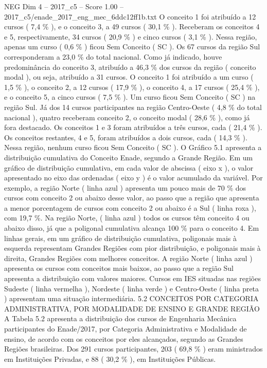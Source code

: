 \begin{textsample}{NEG Dim 4 – 2017\_c5 – Score 1.00 – 2017\_c5/enade\_2017\_eng\_mec\_6ddc12ff1b.txt}
O conceito 1 foi atribuído a 12 cursos ( 7,4 \% ), e o conceito 3, a 49 cursos ( 30,1 \% ).
Receberam os conceitos 4 e 5, respectivamente, 34 cursos ( 20,9 \% ) e cinco cursos ( 3,1 \% ).
Nessa região, apenas um curso ( 0,6 \% ) ficou Sem Conceito ( SC ).
Os 67 cursos da região Sul corresponderam a 23,0 \% do total nacional.
Como já indicado, houve predominância do conceito 3, atribuído a 46,3 \% dos cursos da região ( conceito modal ), ou seja, atribuído a 31 cursos.
O conceito 1 foi atribuído a um curso ( 1,5 \% ), o conceito 2, a 12 cursos ( 17,9 \% ), o conceito 4, a 17 cursos ( 25,4 \% ), e o conceito 5, a cinco cursos ( 7,5 \% ).
Um curso ficou Sem Conceito ( SC ) na região Sul.
Já dos 14 cursos participantes na região Centro-Oeste ( 4,8 \% do total nacional ), quatro receberam conceito 2, o conceito modal ( 28,6 \% ), como já fora destacado.
Os conceitos 1 e 3 foram atribuídos a três cursos, cada ( 21,4 \% ).
Os conceitos restantes, 4 e 5, foram atribuídos a dois cursos, cada ( 14,3 \% ).
Nessa região, nenhum curso ficou Sem Conceito ( SC ).
O Gráfico 5.1 apresenta a distribuição cumulativa do Conceito Enade, segundo a Grande Região.
Em um gráfico de distribuição cumulativa, em cada valor de abscissa ( eixo x ), o valor apresentado no eixo das ordenadas ( eixo y ) é o valor acumulado da variável.
Por exemplo, a região Norte ( linha azul ) apresenta um pouco mais de 70 \% dos cursos com conceito 2 ou abaixo desse valor, ao passo que a região que apresenta a menor porcentagem de cursos com conceito 2 ou abaixo é a Sul ( linha roxa ), com 19,7 \%.
Na região Norte, ( linha azul ) todos os cursos têm conceito 4 ou abaixo disso, já que a poligonal cumulativa alcança 100 \% para o conceito 4.
Em linhas gerais, em um gráfico de distribuição cumulativa, poligonais mais à esquerda representam Grandes Regiões com pior distribuição, e poligonais mais à direita, Grandes Regiões com melhores conceitos.
A região Norte ( linha azul ) apresenta os cursos com conceitos mais baixos, ao passo que a região Sul apresenta a distribuição com valores maiores.
Cursos em IES situadas nas regiões Sudeste ( linha vermelha ), Nordeste ( linha verde ) e Centro-Oeste ( linha preta ) apresentam uma situação intermediária. 5.2 CONCEITOS POR CATEGORIA ADMINISTRATIVA, POR MODALIDADE DE ENSINO E GRANDE REGIÃO A Tabela 5.2 apresenta a distribuição dos cursos de Engenharia Mecânica participantes do Enade/2017, por Categoria Administrativa e Modalidade de ensino, de acordo com os conceitos por eles alcançados, segundo as Grandes Regiões brasileiras.
Dos 291 cursos participantes, 203 ( 69,8 \% ) eram ministrados em Instituições Privadas, e 88 ( 30,2 \% ), em Instituições Públicas.

\end{textsample}
